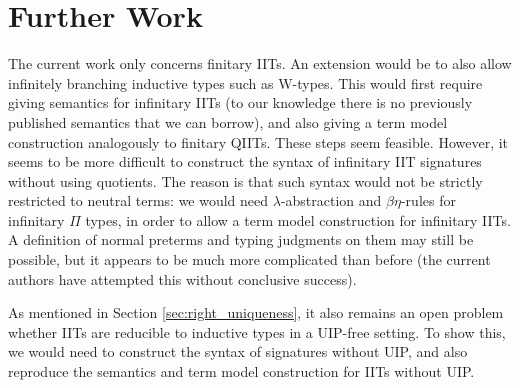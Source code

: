 \documentclass[a4paper,UKenglish,cleveref, autoref]{lipics-v2019}
\begin{document}



\section{Further Work}

The current work only concerns finitary IITs. An extension would be to also
allow infinitely branching inductive types such as W-types. This would first
require giving semantics for infinitary IITs (to our knowledge there is no
previously published semantics that we can borrow), and also giving a term model
construction analogously to finitary QIITs. These steps seem feasible. However,
it seems to be more difficult to construct the syntax of infinitary IIT
signatures without using quotients. The reason is that such syntax would not be
strictly restricted to neutral terms: we would need $\lambda$-abstraction and
$\beta\eta$-rules for infinitary $\Pi$ types, in order to allow a term model
construction for infinitary IITs. A definition of normal preterms and typing
judgments on them may still be possible, but it appears to be much more
complicated than before (the current authors have attempted this without
conclusive success).

As mentioned in Section \ref{sec:right_uniqueness}, it also remains an open
problem whether IITs are reducible to inductive types in a UIP-free setting. To
show this, we would need to construct the syntax of signatures without UIP, and
also reproduce the semantics and term model construction for IITs without UIP.





\newpage

\appendix
\end{document}
